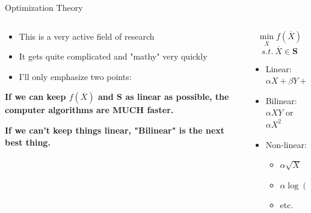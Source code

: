 \documentclass[10pt, aspectratio=169]{beamer}
\begin{document}
\begin{frame}[t]{Optimization Theory}
    \begin{columns}[t]
        \begin{column}[t]{0.5\textwidth}
            \begin{itemize}
                \item This is a very active field of research
                \item It gets quite complicated and "mathy" very quickly
                \item  I'll only emphasize two points:
            \end{itemize}
            \vspace{0.5cm}
            \begin{center}
                \textbf{If we can keep $f(\overline{X})$ and $\textbf{S}$ as linear as possible, the computer algorithms are MUCH faster.}
                
                \vspace{0.4cm}
                
                \textbf{If we can't keep things linear, "Bilinear" is the next best thing.}
            \end{center}
        \end{column}
        \begin{column}[t]{0.5\textwidth}
            $$\min_{\overline{X}} f(\overline{X})$$
            $$s.t.\ \overline{X} \in \textbf{S}$$
            \vspace{1cm}
            \begin{itemize}
                \item Linear: $\alpha X + \beta Y + \gamma Z$
                \item Bilinear: $\alpha X Y$ or $\alpha X^2$
                \item Non-linear: 
                \begin{itemize}
                    \item $\alpha\sqrt{X}$
                    \item $\alpha \log{\left(X\right)}$
                    \item etc.
                \end{itemize}
            \end{itemize}
        \end{column}
    \end{columns}
\end{frame}
\end{document}

